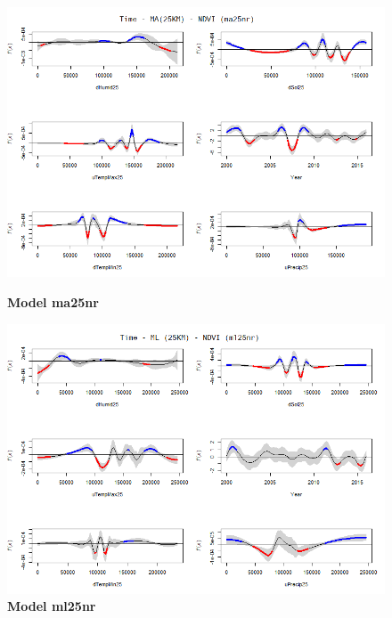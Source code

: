 \begin{figure}[H]
 \centering
    \begin{minipage}{0.8\textwidth}
        \centering
        \includegraphics[width=1.2\textwidth]{ma25nr.png} %
        \caption{\textbf{Model ma25nr}}
    \end{minipage}\hfill
    \begin{minipage}{0.8\textwidth}
        \centering
        \includegraphics[width=1.2\textwidth]{ml25nr.png} %
        \caption{\textbf{Model ml25nr}}
    \end{minipage}
\end{figure}

